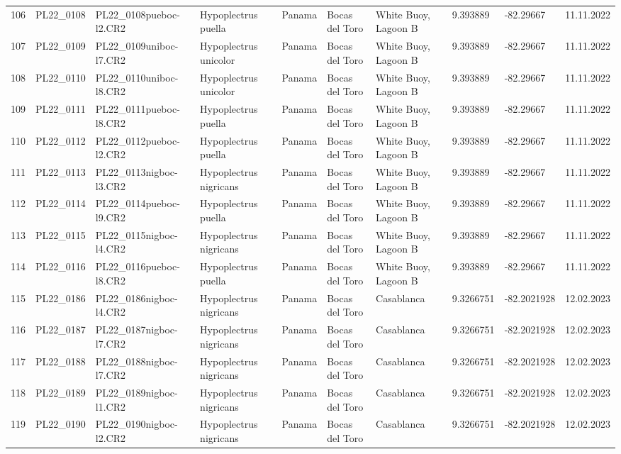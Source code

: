 \begin{table}[ht]
\begin{tabular}{rlllllllll}
  106 & PL22\_0108 & PL22\_0108pueboc-l2.CR2 & Hypoplectrus puella & Panama & Bocas del Toro & White Buoy, Lagoon B & 9.393889 & -82.29667 & 11.11.2022 \\ 
  107 & PL22\_0109 & PL22\_0109uniboc-l7.CR2 & Hypoplectrus unicolor & Panama & Bocas del Toro & White Buoy, Lagoon B & 9.393889 & -82.29667 & 11.11.2022 \\ 
  108 & PL22\_0110 & PL22\_0110uniboc-l8.CR2 & Hypoplectrus unicolor & Panama & Bocas del Toro & White Buoy, Lagoon B & 9.393889 & -82.29667 & 11.11.2022 \\ 
  109 & PL22\_0111 & PL22\_0111pueboc-l8.CR2 & Hypoplectrus puella & Panama & Bocas del Toro & White Buoy, Lagoon B & 9.393889 & -82.29667 & 11.11.2022 \\ 
  110 & PL22\_0112 & PL22\_0112pueboc-l2.CR2 & Hypoplectrus puella & Panama & Bocas del Toro & White Buoy, Lagoon B & 9.393889 & -82.29667 & 11.11.2022 \\ 
  111 & PL22\_0113 & PL22\_0113nigboc-l3.CR2 & Hypoplectrus nigricans  & Panama & Bocas del Toro & White Buoy, Lagoon B & 9.393889 & -82.29667 & 11.11.2022 \\ 
  112 & PL22\_0114 & PL22\_0114pueboc-l9.CR2 & Hypoplectrus puella & Panama & Bocas del Toro & White Buoy, Lagoon B & 9.393889 & -82.29667 & 11.11.2022 \\ 
  113 & PL22\_0115 & PL22\_0115nigboc-l4.CR2 & Hypoplectrus nigricans  & Panama & Bocas del Toro & White Buoy, Lagoon B & 9.393889 & -82.29667 & 11.11.2022 \\ 
  114 & PL22\_0116 & PL22\_0116pueboc-l8.CR2 & Hypoplectrus puella & Panama & Bocas del Toro & White Buoy, Lagoon B & 9.393889 & -82.29667 & 11.11.2022 \\ 
  115 & PL22\_0186 & PL22\_0186nigboc-l4.CR2 & Hypoplectrus nigricans  & Panama & Bocas del Toro & Casablanca & 9.3266751 & -82.2021928 & 12.02.2023 \\ 
  116 & PL22\_0187 & PL22\_0187nigboc-l7.CR2 & Hypoplectrus nigricans  & Panama & Bocas del Toro & Casablanca & 9.3266751 & -82.2021928 & 12.02.2023 \\ 
  117 & PL22\_0188 & PL22\_0188nigboc-l7.CR2 & Hypoplectrus nigricans  & Panama & Bocas del Toro & Casablanca & 9.3266751 & -82.2021928 & 12.02.2023 \\ 
  118 & PL22\_0189 & PL22\_0189nigboc-l1.CR2 & Hypoplectrus nigricans  & Panama & Bocas del Toro & Casablanca & 9.3266751 & -82.2021928 & 12.02.2023 \\ 
  119 & PL22\_0190 & PL22\_0190nigboc-l2.CR2 & Hypoplectrus nigricans  & Panama & Bocas del Toro & Casablanca & 9.3266751 & -82.2021928 & 12.02.2023 \\ 

\end{tabular}
\end{table}
